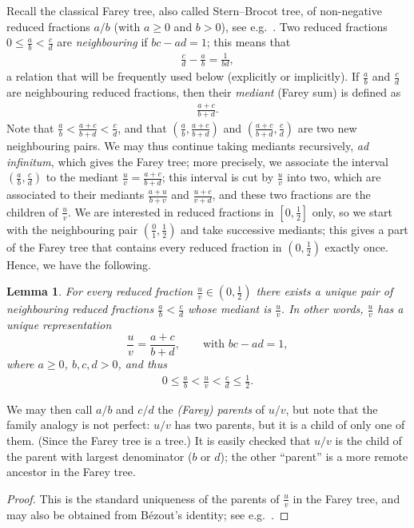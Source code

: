 \documentclass[11pt,reqno,tbtags,a4paper]{amsart}
\numberwithin{equation}{section}
\renewcommand\le{\leq}
\renewcommand\ge{\geq}
\renewcommand\leq{\leqslant}
\renewcommand\geq{\geqslant}
\theoremstyle{plain}%
\newtheorem{lemma}[theorem]{Lemma}
\theoremstyle{definition}
\theoremstyle{remark}
\newcounter{cc}
\newcommand\0{{\boldsymbol 0}}
\newcommand\1{{\boldsymbol 1}}
\begin{document}
Recall the classical Farey tree, also called Stern--Brocot tree, 
of non-negative reduced fractions $a/b$ (with $a\ge0$ and $b>0$),
see e.g.\ \cite[p.~116--123]{CM}.
Two reduced fractions $0\le \frac ab<\frac cd$ are \emph{neighbouring}
if $bc-ad=1$;
this means that
\begin{align}\label{sb1}
  \frac cd - \frac ab = \frac 1{bd},
\end{align}
a relation that will be frequently used below (explicitly or implicitly). 
If $\frac ab$ and
$\frac cd$ are neighbouring reduced fractions, then
their \emph{mediant} (Farey sum) is defined as
\begin{align}\label{mediant}
\frac{a+c}{b+d}.
\end{align}
Note that $\frac ab < \frac{a+c}{b+d} < \frac cd$, and that
$(\frac ab,\frac{a+c}{b+d})$ and $(\frac{a+c}{b+d}, \frac cd)$
are two new neighbouring pairs.
We may thus continue taking mediants recursively, 
\emph{ad infinitum},
which gives the Farey tree; 
more precisely, we associate the interval $(\frac ab,\frac cd)$
to the mediant $\frac uv=\frac{a+c}{b+d}$; this interval is cut by 
$\frac uv$ into two, which are associated to their mediants
$\frac{a+u}{b+v}$ and $\frac{u+c}{v+d}$, and these two fractions are the
children of $\frac uv$.
We are interested in 
reduced fractions in $[0,\tfrac12]$ only,
so we start with the neighbouring pair $(\frac01,\frac12)$ and 
take successive mediants; this gives a part of the Farey tree
that contains every reduced fraction in $(0,\tfrac12)$
exactly once.
Hence, we have the following.

\begin{lemma}\label{Lm3-farey-unique}
For every reduced fraction $\frac uv\in(0,\tfrac12)$ there exists a unique
pair of neighbouring reduced fractions $\frac ab<\frac cd$ whose mediant is
$\frac uv$.
In other words, $\frac uv$ has a
unique representation
\begin{equation}\label{m3-farey}
\frac uv=\frac{a+c}{b+d},\qquad \text{with }bc-ad=1,
\end{equation}
where
$a\ge0$, $b,c,d>0$, and thus
\begin{align}\label{sb2}
0\le \frac ab<\frac uv<\frac cd\le \frac12.
\end{align}
\end{lemma}

We may then call $a/b$ and $c/d$ the \emph{(Farey) parents} of $u/v$,
but
note that the family analogy is not perfect: $u/v$ has two parents, but it
is a child of only one of them. (Since the Farey tree is a tree.)
It is easily checked that $u/v$ is the child of the parent 
with largest denominator ($b$ or $d$); the other ``parent'' is a more remote
ancestor in the Farey tree.
\begin{proof}
This is the standard uniqueness of the parents of $\frac uv$ in the
Farey tree, 
and may also be obtained from B\'ezout's identity;
see e.g.\ \cite[p.~116--118]{CM}.
\end{proof}
\end{document}
